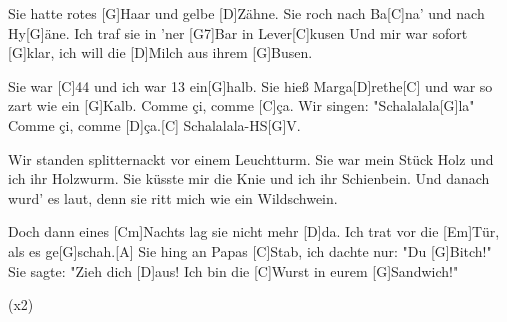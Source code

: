 

\begin{guitar}
	Sie hatte rotes [G]Haar und gelbe [D]Zähne.
	Sie roch nach Ba[C]na' und nach Hy[G]{ä}ne.
	Ich traf sie in 'ner [G7]Bar in Lever[C]kusen
	Und mir war sofort [G]klar, ich will die [D]Milch aus ihrem [G]Busen.
	
	Sie war [C]44 und ich war 13 ein[G]halb.
	Sie hieß Marga[D]rethe[C] und war so zart wie ein [G]Kalb.
	Comme çi, comme [C]{ç}a. Wir singen: "Schalalala[G]la"
	Comme çi, comme [D]{ç}a.[C] Schalalala-HS[G]V.
	
	Wir standen splitternackt vor einem Leuchtturm.
	Sie war mein Stück Holz und ich ihr Holzwurm.
	Sie küsste mir die Knie und ich ihr Schienbein.
	Und danach wurd' es laut, denn sie ritt mich wie ein Wildschwein.
	
	 
	
	Doch dann eines [Cm]Nachts lag sie nicht mehr [D]da.
	Ich trat vor die [Em]Tür, als es ge[G]schah.[A]{}
	Sie hing an Papas [C]Stab, ich dachte nur: "Du [G]Bitch!"
	Sie sagte: "Zieh dich [D]aus! Ich bin die [C]Wurst in eurem [G]Sandwich!"
	
	  (x2)
\end{guitar}